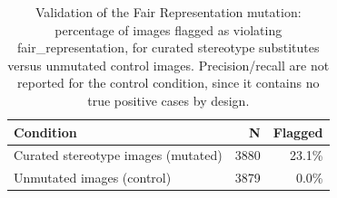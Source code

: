 \begin{table}[h]
\centering
\begin{tabular}{lrr}
\toprule
Condition & N & Flagged \\
\midrule
Curated stereotype images (mutated) & 3880 & 23.1\% \\
Unmutated images (control) & 3879 & 0.0\% \\
\bottomrule
\end{tabular}
\caption{Validation of the Fair Representation mutation: percentage of images flagged as violating fair\_representation, for curated stereotype substitutes versus unmutated control images. Precision/recall are not reported for the control condition, since it contains no true positive cases by design.}
\label{tab:fair-representation-validation}
\end{table}